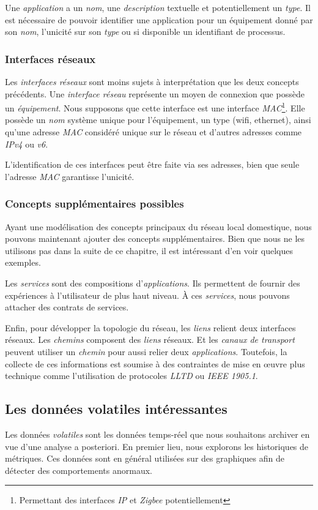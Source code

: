 Une \textit{application} a un \textit{nom}, une \textit{description} textuelle et potentiellement un \textit{type}. Il est nécessaire de pouvoir identifier une application pour un équipement donné par son \textit{nom}, l'unicité sur son \textit{type} ou si disponible un identifiant de processus.

\subsubsection{Interfaces réseaux}
Les \textit{interfaces réseaux} sont moins sujets à interprétation que les deux concepts précédents. Une \textit{interface réseau} représente un moyen de connexion que possède un \textit{équipement}. Nous supposons que cette interface est une interface \textit{MAC}\footnote{Permettant des interfaces \textit{IP} et \textit{Zigbee} potentiellement}. Elle possède un \textit{nom} système unique pour l'équipement, un type (wifi, ethernet), ainsi qu'une adresse \textit{MAC} considéré unique sur le réseau et d'autres adresses comme \textit{IPv4} ou \textit{v6}.

L'identification de ces interfaces peut être faite via ses adresses, bien que seule l'adresse \textit{MAC} garantisse l'unicité.

\subsubsection{Concepts supplémentaires possibles}
Ayant une modélisation des concepts principaux du réseau local domestique, nous pouvons maintenant ajouter des concepts supplémentaires. Bien que nous ne les utilisons pas dans la suite de ce chapitre, il est intéressant d'en voir quelques exemples.

Les \textit{services} sont des compositions d'\textit{applications}. Ils permettent de fournir des expériences à l'utilisateur de plus haut niveau. À ces \textit{services}, nous pouvons attacher des contrats de services.

Enfin, pour développer la topologie du réseau, les \textit{liens} relient deux interfaces réseaux. Les \textit{chemins} composent des \textit{liens} réseaux. Et les \textit{canaux de transport} peuvent utiliser un \textit{chemin} pour aussi relier deux \textit{applications}. Toutefois, la collecte de ces informations est soumise à des contraintes de mise en œuvre plus technique comme l'utilisation de protocoles \textit{LLTD} ou \textit{IEEE 1905.1}.

\subsection{Les données volatiles intéressantes}
Les données \textit{volatiles} sont les données temps-réel que nous souhaitons archiver en vue d'une analyse a posteriori. En premier lieu, nous explorons les historiques de métriques. Ces données sont en général utilisées sur des graphiques afin de détecter des comportements anormaux.


